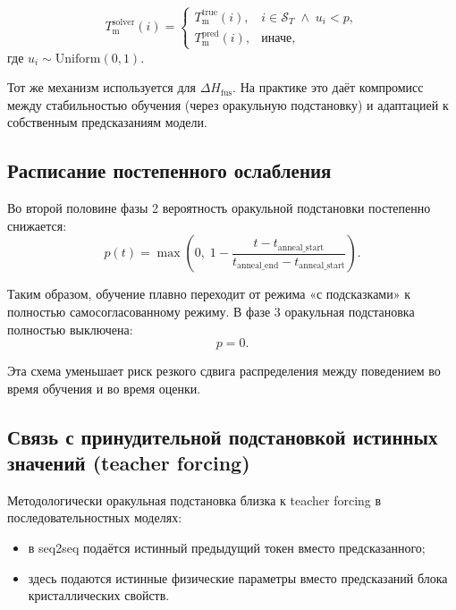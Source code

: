 \documentclass[11pt]{article}
\begin{document}
\begin{equation*}
T_{\mathrm{m}}^{\mathrm{solver}}(i)=
\begin{cases}
T_{\mathrm{m}}^{\mathrm{true}}(i), & i\in\mathcal{S}_T\;\wedge\;u_i<p,\\
T_{\mathrm{m}}^{\mathrm{pred}}(i), & \text{иначе},
\end{cases}
\end{equation*}
где $u_i\sim\mathrm{Uniform}(0,1)$.

Тот же механизм используется для $\Delta H_{\mathrm{fus}}$. На практике это даёт компромисс между стабильностью обучения (через оракульную подстановку) и адаптацией к собственным предсказаниям модели.

\subsection{Расписание постепенного ослабления}

Во второй половине фазы 2 вероятность оракульной подстановки постепенно снижается:
\begin{equation*}
p(t)=\max\left(0,\;1-\frac{t-t_{\mathrm{anneal\_start}}}{t_{\mathrm{anneal\_end}}-t_{\mathrm{anneal\_start}}}\right).
\end{equation*}

Таким образом, обучение плавно переходит от режима «с подсказками» к полностью самосогласованному режиму. В фазе 3 оракульная подстановка полностью выключена:
\begin{equation*}
p=0.
\end{equation*}

Эта схема уменьшает риск резкого сдвига распределения между поведением во время обучения и во время оценки.

\subsection{Связь с принудительной подстановкой истинных значений (teacher forcing)}
\label{subsec:teacher-forcing}

Методологически оракульная подстановка близка к teacher forcing в последовательностных моделях:
\begin{itemize}
  \item в seq2seq подаётся истинный предыдущий токен вместо предсказанного;
  \item здесь подаются истинные физические параметры вместо предсказаний блока кристаллических свойств.
\end{itemize}
\end{document}
